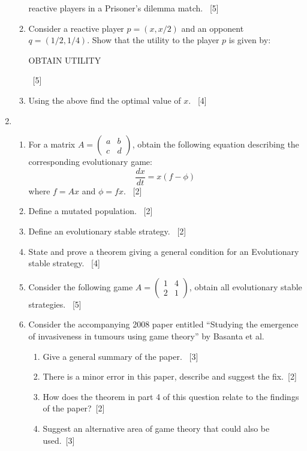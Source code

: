 \documentclass[12pt,a4paper]{article}
\begin{document}
\begin{enumerate}
\begin{enumerate}
            reactive players in a Prisoner's dilemma match.
            ~\hfill{[5]}
        \item Consider a reactive player \(p=(x, x / 2)\) and an opponent
            \(q=(1/2, 1/4)\). Show that the utility to the player \(p\) is given
            by:
            \begin{center}
                OBTAIN UTILITY
            \end{center}
            ~\hfill{[5]}
        \item Using the above find the optimal value of \(x\).
            ~\hfill{[4]}
    \end{enumerate}

\newpage
\item

    \begin{enumerate}
        \item For a matrix \(A=\begin{pmatrix}a&b\\c &d\end{pmatrix}\), obtain
              the following equation describing the corresponding evolutionary
              game:
              \[\frac{dx}{dt}=x(f-\phi)\]
              where \(f=Ax\) and \(\phi=fx\).
              ~\hfill{[2]}
        \item Define a mutated population.
              ~\hfill{[2]}
        \item Define an evolutionary stable strategy.
              ~\hfill{[2]}
        \item State and prove a theorem giving a general condition for an
            Evolutionary stable strategy.
              ~\hfill{[4]}
        \item Consider the following game
        \(A=\begin{pmatrix}1&4\\2 &1\end{pmatrix}\), obtain all evolutionary
            stable strategies.
              ~\hfill{[5]}
         \item Consider the accompanying 2008 paper entitled ``Studying the
             emergence of invasiveness in tumours using game theory'' by Basanta
             et al.
             \begin{enumerate}
                 \item Give a general summary of the paper.
                     ~\hfill{[3]}
                 \item There is a minor error in this paper, describe and
                     suggest the fix.~\hfill{[2]}
                 \item How does the theorem in part 4 of this question relate to
                     the findings of the paper?~\hfill{[2]}
                 \item Suggest an alternative area of game theory that could
                     also be used.~\hfill{[3]}
             \end{enumerate}
    \end{enumerate}


\end{enumerate}
\end{document}
